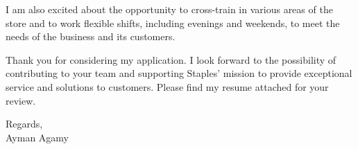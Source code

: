 \documentclass{article}
\begin{document}
	\vspace{1em}
	
	\noindent
	I am also excited about the opportunity to cross-train in various areas of the store and to work flexible shifts, including evenings and weekends, to meet the needs of the business and its customers.
	
	\vspace{1em}
	
	\noindent
	Thank you for considering my application. I look forward to the possibility of contributing to your team and supporting Staples’ mission to provide exceptional service and solutions to customers. Please find my resume attached for your review.
	
	\vspace{1em}
	
	
	\noindent
	Regards, \\
	Ayman Agamy
	
\end{document}
